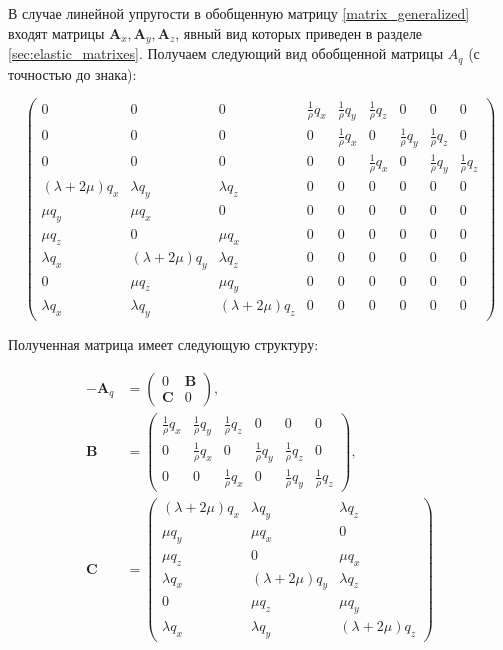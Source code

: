 В случае линейной упругости в обобщенную матрицу \eqref{matrix_generalized} входят матрицы $\mathbf{A}_x, \mathbf{A}_y, \mathbf{A}_z$, явный вид которых приведен в разделе \ref{sec:elastic_matrixes}. Получаем следующий вид обобщенной матрицы $A_q$ (с точностью до знака):

\begin{equation}
\label{matrix_generalized_elastic}
\left( \begin{array}{cccccccccccc}
0 & 0 & 0 & \frac 1 \rho q_x & \frac 1 \rho q_y & \frac 1 \rho q_z & 0 & 0 & 0 \\ 
0 & 0 & 0 & 0 & \frac 1 \rho q_x & 0 & \frac 1 \rho q_y & \frac 1 \rho q_z & 0 \\ 
0 & 0 & 0 & 0 & 0 & \frac 1 \rho q_x & 0 & \frac 1 \rho q_y & \frac 1 \rho q_z \\ 
(\lambda+2\mu) q_x & \lambda q_y & \lambda q_z & 0 & 0 & 0 & 0 & 0 & 0 \\ 
\mu q_y & \mu q_x & 0 & 0 & 0 & 0 & 0 & 0 & 0 \\ 
\mu q_z & 0 & \mu q_x & 0 & 0 & 0 & 0 & 0 & 0 \\ 
\lambda q_x & (\lambda+2\mu) q_y & \lambda q_z & 0 & 0 & 0 & 0 & 0 & 0 \\ 
0 & \mu q_z & \mu q_y & 0 & 0 & 0 & 0 & 0 & 0 \\ 
\lambda q_x & \lambda q_y & (\lambda+2\mu) q_z & 0 & 0 & 0 & 0 & 0 & 0  
\end{array} \right)
\end{equation}

Полученная матрица имеет следующую структуру:

\begin{align}
- \mathbf{A}_q &=
\left( \begin{array}{cccccccccccc}
0 & \mathbf{B} \\
\mathbf{C} & 0
\end{array} \right),
\nonumber\\
\mathbf{B} &= 
\left( \begin{array}{cccccccccccc}
\frac 1 \rho q_x & \frac 1 \rho q_y & \frac 1 \rho q_z & 0 & 0 & 0 \\ 
0 & \frac 1 \rho q_x & 0 & \frac 1 \rho q_y & \frac 1 \rho q_z & 0 \\ 
0 & 0 & \frac 1 \rho q_x & 0 & \frac 1 \rho q_y & \frac 1 \rho q_z 
\end{array} \right),
\nonumber\\
\mathbf{C} &= 
\left( \begin{array}{cccccccccccc}
(\lambda+2\mu) q_x & \lambda q_y & \lambda q_z \\ 
\mu q_y & \mu q_x & 0 \\ 
\mu q_z & 0 & \mu q_x \\ 
\lambda q_x & (\lambda+2\mu) q_y & \lambda q_z \\ 
0 & \mu q_z & \mu q_y \\ 
\lambda q_x & \lambda q_y & (\lambda+2\mu) q_z  
\end{array} \right)
\end{align}

